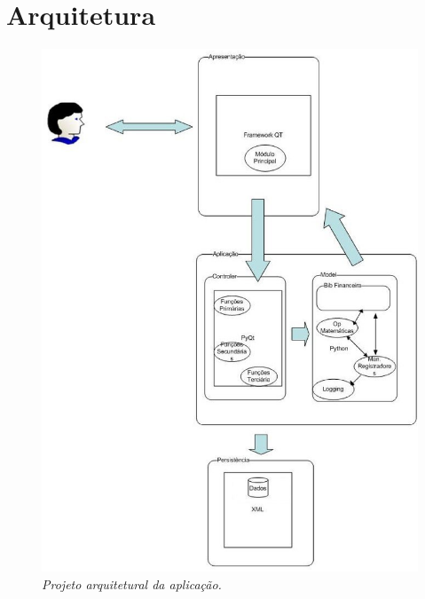\chapter{Arquitetura}

\begin{figure}[!h]
 \includegraphics[scale=0.5]{arquitetura.eps}
 \caption{\it Projeto arquitetural da aplicação.} \label{fig:arquit}
\end{figure}

